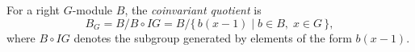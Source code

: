 For a right $G$-module $B$, the \emph{coinvariant quotient} is
$$B_G = B / B \circ IG = B / \{\,b(x - 1) \mid b \in B,\; x \in G\,\},$$
where $B \circ IG$ denotes the subgroup generated by elements of the form $b(x - 1)$.

